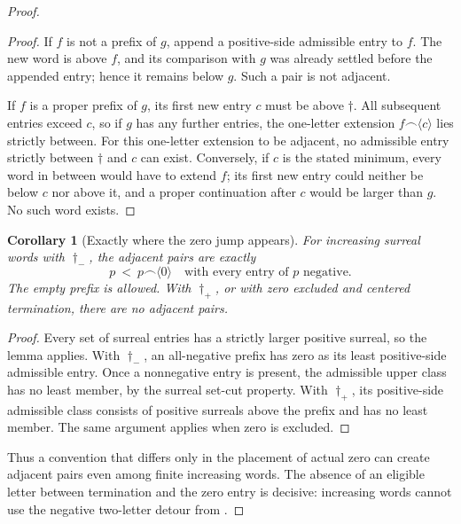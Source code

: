 \documentclass[11pt]{article}
\newtheorem{corollary}[corollary]{Corollary}
\theoremstyle{definition}
\theoremstyle{remark}
\begin{document}
\begin{proof}
\begin{proof}
If \(f\) is not a prefix of \(g\), append a positive-side
admissible entry to \(f\).  The new word is above \(f\), and its
comparison with \(g\) was already settled before the appended
entry; hence it remains below \(g\).  Such a pair is not adjacent.

If \(f\) is a proper prefix of \(g\), its first new entry \(c\)
must be above \(\dagger\).  All subsequent entries exceed \(c\),
so if \(g\) has any further entries, the one-letter extension
\(f\mathbin{\frown}\langle c\rangle\) lies strictly between.
For this one-letter extension to be adjacent, no admissible entry
strictly between \(\dagger\) and \(c\) can exist.  Conversely,
if \(c\) is the stated minimum, every word in between would have
to extend \(f\); its first new entry could neither be below \(c\)
nor above it, and a proper continuation after \(c\) would be larger
than \(g\).  No such word exists.
\end{proof}

\begin{corollary}[Exactly where the zero jump appears]
\label{swo:sh:wv:zero-adjacency}
For increasing surreal words with \(\dagger_-\), the adjacent
pairs are exactly
\[
          p\ <\ p\mathbin{\frown}\langle0\rangle
          \quad\text{with every entry of \(p\) negative}.
\]
The empty prefix is allowed.  With \(\dagger_+\), or with zero
excluded and centered termination, there are no adjacent pairs.
\end{corollary}

\begin{proof}
Every set of surreal entries has a strictly larger positive surreal,
so the lemma applies.  With \(\dagger_-\), an all-negative prefix
has zero as its least positive-side admissible entry.  Once a
nonnegative entry is present, the admissible upper class has no
least member, by the surreal set-cut property.  With
\(\dagger_+\), its positive-side admissible class consists of
positive surreals above the prefix and has no least member.
The same argument applies when zero is excluded.
\end{proof}

Thus a convention that differs only in the placement of actual
zero can create adjacent pairs even among finite increasing words.
The absence of an eligible letter between termination and the zero
entry is decisive: increasing words cannot use the negative
two-letter detour from .


\end{proof}
\end{document}
